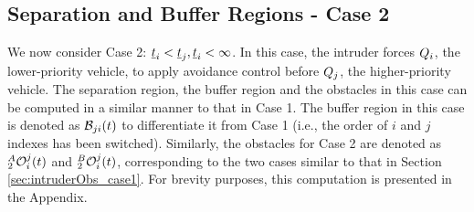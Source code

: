 \subsection{Separation and Buffer Regions - Case 2} \label{sec:case2_maintext}
We now consider Case 2: $\underline{t}_i < \underline{t}_j, \underline{t}_i <\infty$. In this case, the intruder forces $Q_i$, the lower-priority vehicle, to apply avoidance control before $Q_j$, the higher-priority vehicle. 
The separation region, the buffer region and the obstacles in this case can be computed in a similar manner to that in Case 1.
The buffer region in this case is denoted as $\mathcal{B}_{ji}(t)$ to differentiate it from Case 1 (i.e., the order of $i$ and $j$ indexes has been switched). 
Similarly, the obstacles for Case 2 are denoted as $_2^A\mathcal{O}_i^j(t)$ and $_2^B\mathcal{O}_i^j(t)$, corresponding to the two cases similar to that in Section \eqref{sec:intruderObs_case1}. 
For brevity purposes, this computation is presented in the Appendix. 
